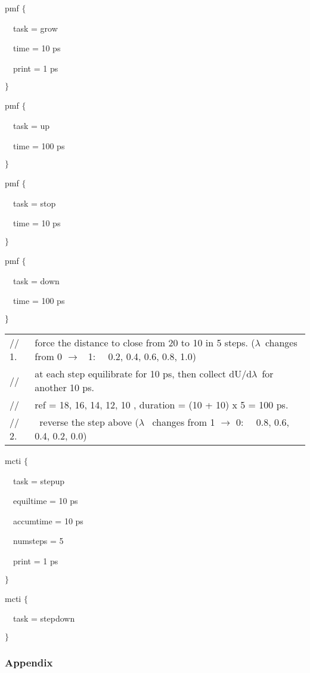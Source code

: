pmf $\{$

~~task = grow

~~time = 10 ps

~~print = 1 ps

$\}$

pmf $\{$

~~task = up

~~time = 100 ps

$\}$

pmf $\{$

~~task = stop

~~time = 10 ps

$\}$

pmf $\{$

~~task = down

~~time = 100 ps

$\}\medskip $

\begin{tabular}{ll}
{\footnotesize // 1. } & {\footnotesize force the distance to close from 20 
to 10 %
in 5 steps. (}$\lambda ${\footnotesize \ changes from 0 }$\rightarrow $
{\footnotesize \ 1: ~~0.2, 0.4, 0.6, 0.8, 1.0)} \\ 
{\footnotesize // } & {\footnotesize at each step equilibrate for 10 ps,
then collect dU/d}$\lambda ${\footnotesize \ for another 10 ps.} \\ 
{\footnotesize //} & {\footnotesize ref = 18, 16, 14, 12, 10 
, duration = (10 + 10) x 5 = 100 ps.} \\ 
{\footnotesize // 2.} & {\footnotesize \ reverse the step above (}$\lambda $
{\footnotesize \ changes from 1 }$\rightarrow $ {\footnotesize 0: ~~0.8,
0.6, 0.4, 0.2, 0.0)}
\end{tabular}

mcti $\{$

~~task = stepup

~~equiltime = 10 ps

~~accumtime = 10 ps

~~numsteps = 5

~~print = 1 ps

$\}$

mcti $\{$

~~task = stepdown

$\}$

\subsubsection{Appendix}

